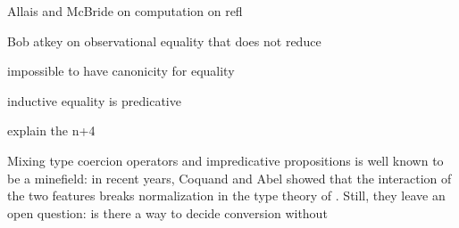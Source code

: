 Allais and McBride on computation on refl

Bob atkey on observational equality that does not reduce

impossible to have canonicity for equality

inductive equality is predicative

explain the n+4


Mixing type coercion operators and impredicative propositions is well known to 
be a minefield:
in recent years, Coquand and Abel showed that the interaction of the two features 
breaks normalization in the type theory of \Lean {}.
% 
Still, they leave an open question: is there a way to decide conversion without

 

